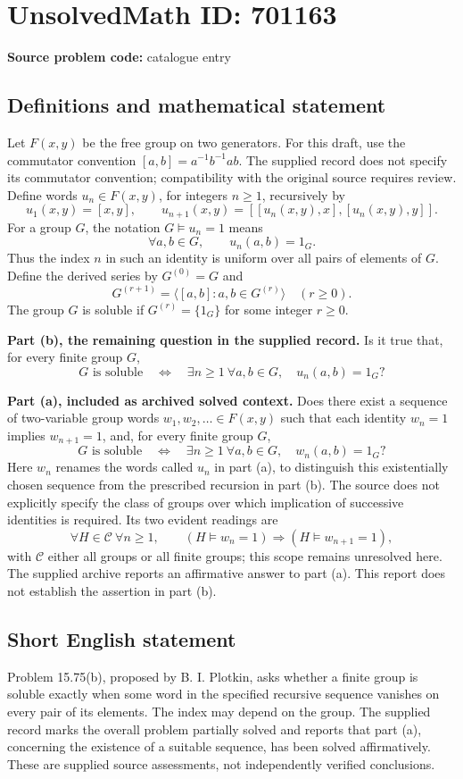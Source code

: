 \documentclass[11pt]{article}
\begin{document}
\section*{UnsolvedMath ID: 701163}
\textbf{Source problem code:} catalogue entry
\subsection{Definitions and mathematical statement}
Let \(F(x,y)\) be the free group on two generators. For this draft, use the commutator convention \([a,b]=a^{-1}b^{-1}ab\). The supplied record does not specify its commutator convention; compatibility with the original source requires review. Define words \(u_n\in F(x,y)\), for integers \(n\geq 1\), recursively by
\[
u_1(x,y)=[x,y],\qquad
u_{n+1}(x,y)=[[u_n(x,y),x],[u_n(x,y),y]].
\]
For a group \(G\), the notation \(G\models u_n=1\) means
\[
\forall a,b\in G,\qquad u_n(a,b)=1_G.
\]
Thus the index \(n\) in such an identity is uniform over all pairs of elements of \(G\). Define the derived series by \(G^{(0)}=G\) and
\[
G^{(r+1)}=\langle [a,b]:a,b\in G^{(r)}\rangle
\quad(r\geq 0).
\]
The group \(G\) is soluble if \(G^{(r)}=\{1_G\}\) for some integer \(r\geq 0\).

\textbf{Part (b), the remaining question in the supplied record.} Is it true that, for every finite group \(G\),
\[
G\text{ is soluble}
\quad\Longleftrightarrow\quad
\exists n\geq 1\ \forall a,b\in G,\quad u_n(a,b)=1_G?
\]

\textbf{Part (a), included as archived solved context.} Does there exist a sequence of two-variable group words \(w_1,w_2,\ldots\in F(x,y)\) such that each identity \(w_n=1\) implies \(w_{n+1}=1\), and, for every finite group \(G\),
\[
G\text{ is soluble}
\quad\Longleftrightarrow\quad
\exists n\geq 1\ \forall a,b\in G,\quad w_n(a,b)=1_G?
\]
Here \(w_n\) renames the words called \(u_n\) in part (a), to distinguish this existentially chosen sequence from the prescribed recursion in part (b). The source does not explicitly specify the class of groups over which implication of successive identities is required. Its two evident readings are
\[
\forall H\in\mathcal C\ \forall n\geq 1,\qquad
(H\models w_n=1)\Longrightarrow(H\models w_{n+1}=1),
\]
with \(\mathcal C\) either all groups or all finite groups; this scope remains unresolved here. The supplied archive reports an affirmative answer to part (a). This report does not establish the assertion in part (b).
\subsection{Short English statement}
Problem 15.75(b), proposed by B. I. Plotkin, asks whether a finite group is soluble exactly when some word in the specified recursive sequence vanishes on every pair of its elements. The index may depend on the group. The supplied record marks the overall problem partially solved and reports that part (a), concerning the existence of a suitable sequence, has been solved affirmatively. These are supplied source assessments, not independently verified conclusions.
\end{document}
